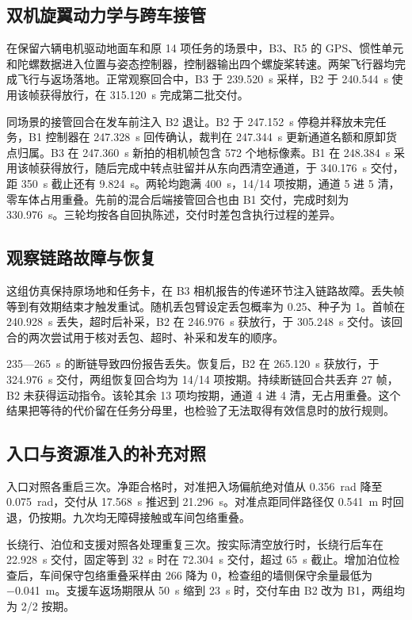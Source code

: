 \subsection{双机旋翼动力学与跨车接管}\label{sec:4.8}

在保留六辆电机驱动地面车和原 14 项任务的场景中，B3、R5 的 GPS、惯性单元和陀螺数据进入位置与姿态控制器，控制器输出四个螺旋桨转速。两架飞行器均完成飞行与返场落地。正常观察回合中，B3 于 239.520~s 采样，B2 于 240.544~s 使用该帧获得放行，在 315.120~s 完成第二批交付。

同场景的接管回合在发车前注入 B2 退让。B2 于 247.152~s 停稳并释放未完任务，B1 控制器在 247.328~s 回传确认，裁判在 247.344~s 更新通道名额和原卸货点归属。B3 在 247.360~s 新拍的相机帧包含 572 个地标像素。B1 在 248.384~s 采用该帧获得放行，随后完成中转点驻留并从东向西清空通道，于 340.176~s 交付，距 350~s 截止还有 9.824~s。两轮均跑满 400~s，14/14 项按期，通道 5 进 5 清，零车体占用重叠。先前的混合后端接管回合也由 B1 交付，完成时刻为 330.976~s。三轮均按各自回执陈述，交付时差包含执行过程的差异。

\subsection{观察链路故障与恢复}\label{sec:4.9}

这组仿真保持原场地和任务卡，在 B3 相机报告的传递环节注入链路故障。丢失帧等到有效期结束才触发重试。随机丢包臂设定丢包概率为 0.25、种子为 1。首帧在 240.928~s 丢失，超时后补采，B2 在 246.976~s 获放行，于 305.248~s 交付。该回合的两次尝试用于核对丢包、超时、补采和发车的顺序。

235—265~s 的断链导致四份报告丢失。恢复后，B2 在 265.120~s 获放行，于 324.976~s 交付，两组恢复回合均为 14/14 项按期。持续断链回合共丢弃 27 帧，B2 未获得运动指令。该轮其余 13 项均按期，通道 4 进 4 清，无占用重叠。这个结果把等待的代价留在任务分母里，也检验了无法取得有效信息时的放行规则。

\subsection{入口与资源准入的补充对照}\label{sec:4.10}

入口对照各重启三次。净距合格时，对准把入场偏航绝对值从 0.356~rad 降至 0.075~rad，交付从 17.568~s 推迟到 21.296~s。对准点距同伴路径仅 0.541~m 时回退，仍按期。九次均无障碍接触或车间包络重叠。

长绕行、泊位和支援对照各处理重复三次。按实际清空放行时，长绕行后车在 22.928~s 交付，固定等到 32~s 时在 72.304~s 交付，超过 65~s 截止。增加泊位检查后，车间保守包络重叠采样由 266 降为 0，检查组的墙侧保守余量最低为 −0.041~m。支援车返场期限从 50~s 缩到 23~s 时，交付车由 B2 改为 B1，两组均为 2/2 按期。
